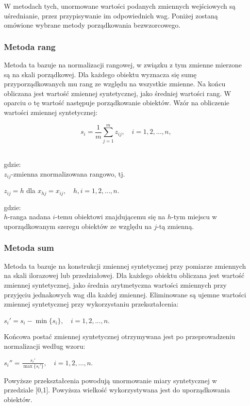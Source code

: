 \documentclass[12pt,a4paper]{report}
\begin{document}
W metodach tych, unormowane wartości podanych zmiennych wejściowych są uśrednianie, przez przypisywanie im odpowiednich wag. 
Poniżej zostaną omówione wybrane metody porządkowania bezwzorcowego.

\subsubsection{Metoda rang}
\noindent


Metoda ta bazuje na normalizacji rangowej, w związku z tym zmienne mierzone są na skali porządkowej. Dla każdego obiektu wyznacza się sumę przyporządkowanych mu rang ze względu na wszystkie zmienne. Na końcu obliczana jest wartość zmiennej syntetycznej, jako średniej wartości rang. W oparciu o tę wartość następuje porządkowanie obiektów. Wzór na obliczenie wartości zmiennej syntetycznej: 
\begin{center}
$$s_{i}=\frac{1}{m}\sum_{j=1}^{m} z_{ij},\quad i=1, 2, ..., n,$$\\
\end{center}
gdzie:\\
$z_{ij}$-zmienna znormalizowana rangowo, tj.
\begin{center}
$z_{ij}=h$ dla $x_{hj}=x_{ij}, \quad h,i=1, 2, ..., n.$
\end{center}
gdzie:\\
$h$-ranga nadana $i$-temu obiektowi znajdującemu się na $h$-tym miejscu w uporządkowanym szeregu obiektów ze względu na $j$-tą zmienną.


\subsubsection{Metoda sum}
\noindent


Metoda ta bazuje na konstrukcji zmiennej syntetycznej przy pomiarze zmiennych na skali ilorazowej lub przedziałowej. Dla każdego obiektu obliczana jest wartość zmiennej syntetycznej, jako średnia arytmetyczna wartości zmiennych przy przyjęciu jednakowych wag dla każdej zmiennej. Eliminowane są ujemne wartości zmiennej syntetycznej przy wykorzystaniu przekształcenia: 
\begin{center}
$s_{i}'=s_{i}-\min\{s_i\}, \quad i=1, 2, ..., n$.\\
\end{center}

Końcowa postać zmiennej syntetycznej otrzymywana jest po przeprowadzeniu normalizacji według wzoru:
\begin{center}
$s_{i}''=\frac{s_{i}'}{\max\{s_{i}'\}},\quad i=1, 2, ..., n$.\\
\end{center}
Powyższe przekształcenia powodują unormowanie miary syntetycznej w przedziale [0,1]. Powyższa wielkość wykorzystywana jest do uporządkowania obiektów.
\newpage
\end{document}
